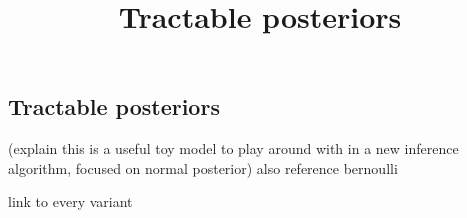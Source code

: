 \title{Tractable posteriors}

\subsection{Tractable posteriors}

 (explain this is a useful toy model to play
    around with in a new inference algorithm, focused on normal
    posterior)
    also reference bernoulli

link to every variant
